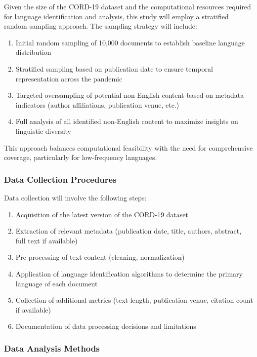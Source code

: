 \documentclass[
]{article}
\providecommand{\tightlist}{%
  \setlength{\itemsep}{0pt}\setlength{\parskip}{0pt}}\usepackage{longtable,booktabs,array}
\begin{document}
Given the size of the CORD-19 dataset and the computational resources
required for language identification and analysis, this study will
employ a stratified random sampling approach. The sampling strategy will
include:

\begin{enumerate}
\def\labelenumi{\arabic{enumi}.}
\tightlist
\item
  Initial random sampling of 10,000 documents to establish baseline
  language distribution
\item
  Stratified sampling based on publication date to ensure temporal
  representation across the pandemic
\item
  Targeted oversampling of potential non-English content based on
  metadata indicators (author affiliations, publication venue, etc.)
\item
  Full analysis of all identified non-English content to maximize
  insights on linguistic diversity
\end{enumerate}

This approach balances computational feasibility with the need for
comprehensive coverage, particularly for low-frequency languages.

\subsubsection{Data Collection
Procedures}\label{data-collection-procedures}

Data collection will involve the following steps:

\begin{enumerate}
\def\labelenumi{\arabic{enumi}.}
\tightlist
\item
  Acquisition of the latest version of the CORD-19 dataset
\item
  Extraction of relevant metadata (publication date, title, authors,
  abstract, full text if available)
\item
  Pre-processing of text content (cleaning, normalization)
\item
  Application of language identification algorithms to determine the
  primary language of each document
\item
  Collection of additional metrics (text length, publication venue,
  citation count if available)
\item
  Documentation of data processing decisions and limitations
\end{enumerate}

\subsubsection{Data Analysis Methods}\label{data-analysis-methods}
\end{document}
